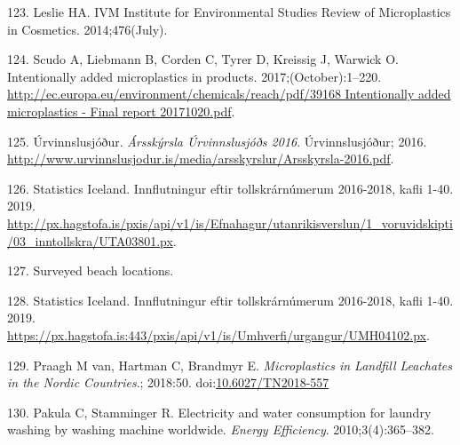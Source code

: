\documentclass[icelandic,]{book}
\begin{document}
\leavevmode\hypertarget{ref-Leslie2014}{}%
123. Leslie HA. IVM Institute for Environmental Studies Review of Microplastics in Cosmetics. 2014;476(July).

\leavevmode\hypertarget{ref-Scudo2017}{}%
124. Scudo A, Liebmann B, Corden C, Tyrer D, Kreissig J, Warwick O. Intentionally added microplastics in products. 2017;(October):1--220. \href{http://ec.europa.eu/environment/chemicals/reach/pdf/39168\%20Intentionally\%20added\%20microplastics\%20-\%20Final\%20report\%2020171020.pdf}{http://ec.europa.eu/environment/chemicals/reach/pdf/39168 Intentionally added microplastics - Final report 20171020.pdf}.

\leavevmode\hypertarget{ref-Urvinnslusjouxf0ur2016}{}%
125. Úrvinnslusjóður. \emph{Ársskýrsla Úrvinnslusjóðs 2016}. Úrvinnslusjóður; 2016. \url{http://www.urvinnslusjodur.is/media/arsskyrslur/Arsskyrsla-2016.pdf}.

\leavevmode\hypertarget{ref-tollurinn}{}%
126. Statistics Iceland. Innflutningur eftir tollskrárnúmerum 2016-2018, kafli 1-40. 2019. \url{http://px.hagstofa.is/pxis/api/v1/is/Efnahagur/utanrikisverslun/1_voruvidskipti/03_inntollskra/UTA03801.px}.

\leavevmode\hypertarget{ref-ospar2019}{}%
127. Surveyed beach locations.

\leavevmode\hypertarget{ref-tollurinn2}{}%
128. Statistics Iceland. Innflutningur eftir tollskrárnúmerum 2016-2018, kafli 1-40. 2019. \url{https://px.hagstofa.is:443/pxis/api/v1/is/Umhverfi/urgangur/UMH04102.px}.

\leavevmode\hypertarget{ref-Praagh1277395}{}%
129. Praagh M van, Hartman C, Brandmyr E. \emph{Microplastics in Landfill Leachates in the Nordic Countries}.; 2018:50. doi:\href{https://doi.org/10.6027/TN2018-557}{10.6027/TN2018-557}

\leavevmode\hypertarget{ref-pakula2010electricity}{}%
130. Pakula C, Stamminger R. Electricity and water consumption for laundry washing by washing machine worldwide. \emph{Energy Efficiency}. 2010;3(4):365--382.
\end{document}
